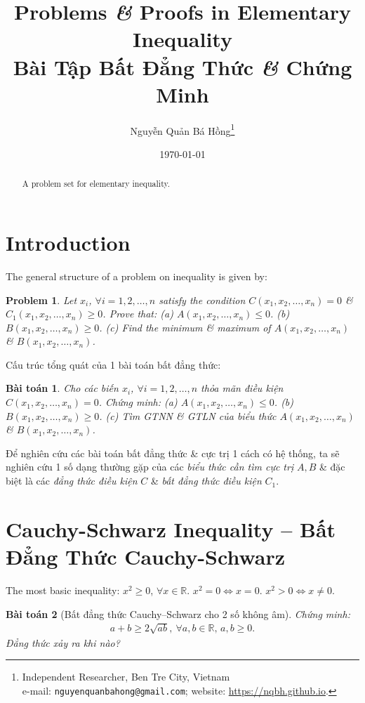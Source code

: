 \documentclass{article}
\title{Problems \textit{\&} Proofs in Elementary Inequality\\Bài Tập Bất Đẳng Thức \textit{\&} Chứng Minh}
\author{Nguyễn Quản Bá Hồng\footnote{Independent Researcher, Ben Tre City, Vietnam\\e-mail: \texttt{nguyenquanbahong@gmail.com}; website: \url{https://nqbh.github.io}.}}
\date{\today}
\newtheorem{baitoan}{Bài toán}
\newtheorem{problem}{Problem}
\begin{document}
\maketitle
\begin{abstract}
	A problem set for elementary inequality.
\end{abstract}
\tableofcontents


\section{Introduction}
The general structure of a problem on inequality is given by:

\begin{problem}
	Let $x_i$, $\forall i = 1,2,\ldots,n$ satisfy the condition $C(x_1,x_2,\ldots,x_n) = 0$ \& $C_1(x_1,x_2,\ldots,x_n)\ge0$. Prove that: (a) $A(x_1,x_2,\ldots,x_n)\le0$. (b) $B(x_1,x_2,\ldots,x_n)\ge0$. (c) Find the minimum \& maximum of $A(x_1,x_2,\ldots,x_n)$ \& $B(x_1,x_2,\ldots,x_n)$.
\end{problem}
Cấu trúc tổng quát của 1 bài toán bất đẳng thức:

\begin{baitoan}
	Cho các biến $x_i$, $\forall i = 1,2,\ldots,n$ thỏa mãn điều kiện $C(x_1,x_2,\ldots,x_n) = 0$. Chứng minh: (a) $A(x_1,x_2,\ldots,x_n)\le0$. (b) $B(x_1,x_2,\ldots,x_n)\ge0$. (c) Tìm {\rm GTNN} \& {\rm GTLN} của biểu thức $A(x_1,x_2,\ldots,x_n)$ \& $B(x_1,x_2,\ldots,x_n)$.
\end{baitoan}
Để nghiên cứu các bài toán bất đẳng thức \& cực trị 1 cách có hệ thống, ta sẽ nghiên cứu 1 số dạng thường gặp của các \textit{biểu thức cần tìm cực trị} $A,B$ \& đặc biệt là các \textit{đẳng thức điều kiện} $C$ \& \textit{bất đẳng thức điều kiện} $C_1$.


\section{Cauchy-Schwarz Inequality -- Bất Đẳng Thức Cauchy-Schwarz}
The most basic inequality: $x^2\ge0$, $\forall x\in\mathbb{R}$. $x^2 = 0\Leftrightarrow x = 0$. $x^2 > 0\Leftrightarrow x\ne0$.

\begin{baitoan}[Bất đẳng thức Cauchy--Schwarz cho 2 số không âm]
	Chứng minh:
	\begin{align*}
		\boxed{a + b\ge2\sqrt{ab},\ \forall a,b\in\mathbb{R},\,a,b\ge 0.}
	\end{align*}
	Đẳng thức xảy ra khi nào?
\end{baitoan}
\end{document}
